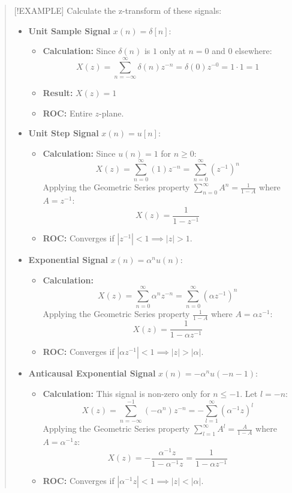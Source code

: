 \begin{quote}
{[}!EXAMPLE{]} Calculate the z-transform of these signals:

\begin{itemize}
\item
  \textbf{Unit Sample Signal} \(x(n) = \delta[n]\):

  \begin{itemize}
  \tightlist
  \item
    \textbf{Calculation:} Since \(\delta(n)\) is \(1\) only at \(n=0\)
    and \(0\) elsewhere:
    \[X(z) = \sum_{n=-\infty}^{\infty} \delta(n)z^{-n} = \delta(0)z^{-0} = 1 \cdot 1 = 1\]
  \item
    \textbf{Result:} \(X(z) = 1\)
  \item
    \textbf{ROC:} Entire \(z\)-plane.
  \end{itemize}
\item
  \textbf{Unit Step Signal} \(x(n) = u[n]\):

  \begin{itemize}
  \tightlist
  \item
    \textbf{Calculation:} Since \(u(n) = 1\) for \(n \ge 0\):
    \[X(z) = \sum_{n=0}^{\infty} (1)z^{-n} = \sum_{n=0}^{\infty} (z^{-1})^n\]
    Applying the Geometric Series property
    \(\sum_{n=0}^{\infty} A^n = \frac{1}{1-A}\) where \(A = z^{-1}\):
    \[X(z) = \frac{1}{1-z^{-1}}\]
  \item
    \textbf{ROC:} Converges if \(|z^{-1}| < 1 \implies |z| > 1\).
  \end{itemize}
\item
  \textbf{Exponential Signal} \(x(n) = \alpha^n u(n)\):

  \begin{itemize}
  \tightlist
  \item
    \textbf{Calculation:}
    \[X(z) = \sum_{n=0}^{\infty} \alpha^n z^{-n} = \sum_{n=0}^{\infty} (\alpha z^{-1})^n\]
    Applying the Geometric Series property \(\frac{1}{1-A}\) where
    \(A = \alpha z^{-1}\): \[X(z) = \frac{1}{1-\alpha z^{-1}}\]
  \item
    \textbf{ROC:} Converges if
    \(|\alpha z^{-1}| < 1 \implies |z| > |\alpha|\).
  \end{itemize}
\item
  \textbf{Anticausal Exponential Signal} \(x(n) = -\alpha^n u(-n-1)\):

  \begin{itemize}
  \tightlist
  \item
    \textbf{Calculation:} This signal is non-zero only for \(n \le -1\).
    Let \(l = -n\):
    \[X(z) = \sum_{n=-\infty}^{-1} (-\alpha^n)z^{-n} = -\sum_{l=1}^{\infty} (\alpha^{-1}z)^l\]
    Applying the Geometric Series property
    \(\sum_{l=1}^{\infty} A^l = \frac{A}{1-A}\) where
    \(A = \alpha^{-1}z\):
    \[X(z) = -\frac{\alpha^{-1}z}{1-\alpha^{-1}z} = \frac{1}{1-\alpha z^{-1}}\]
  \item
    \textbf{ROC:} Converges if
    \(|\alpha^{-1}z| < 1 \implies |z| < |\alpha|\).
  \end{itemize}
\end{itemize}
\end{quote}

